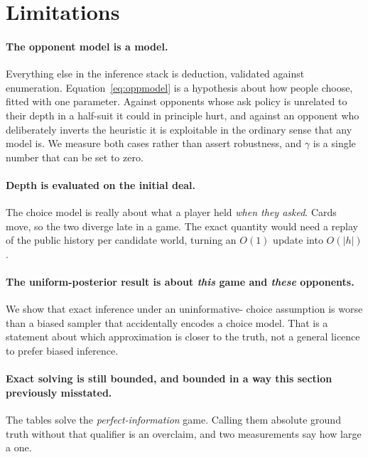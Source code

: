 \documentclass[11pt,a4paper]{article}
\begin{document}
\section{Limitations}
\label{sec:limitations}

\paragraph{The opponent model is a model.} Everything else in the inference
stack is deduction, validated against enumeration. Equation~\eqref{eq:oppmodel}
is a hypothesis about how people choose, fitted with one parameter. Against
opponents whose ask policy is unrelated to their depth in a half-suit it could
in principle hurt, and against an opponent who deliberately inverts the
heuristic it is exploitable in the ordinary sense that any model is. We measure
both cases rather than assert robustness, and $\gamma$ is a single number that
can be set to zero.

\paragraph{Depth is evaluated on the initial deal.} The choice model is really
about what a player held \emph{when they asked}. Cards move, so the two diverge
late in a game. The exact quantity would need a replay of the public history per
candidate world, turning an $O(1)$ update into $O(|h|)$.

\paragraph{The uniform-posterior result is about \emph{this} game and
\emph{these} opponents.} We show that exact inference under an uninformative-
choice assumption is worse than a biased sampler that accidentally encodes a
choice model. That is a statement about which approximation is closer to the
truth, not a general licence to prefer biased inference.

\paragraph{Exact solving is still bounded, and bounded in a way this section
previously misstated.} The tables solve the \emph{perfect-information} game.
Calling them absolute ground truth without that qualifier is an overclaim, and
two measurements say how large a one.
\end{document}
